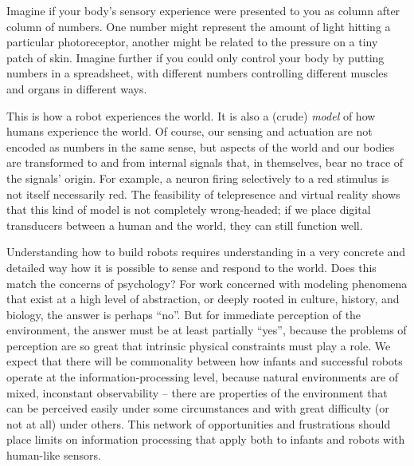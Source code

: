 


Imagine if your body's sensory experience were presented to you as
column after column of numbers.  One number might represent the amount
of light hitting a particular photoreceptor, another might be related
to the pressure on a tiny patch of skin.  Imagine further if you could
only control your body by putting numbers in a spreadsheet, with
different numbers controlling different muscles and organs in
different ways.

This is how a robot experiences the world.  It is also a (crude) {\em
model} of how humans experience the world.  Of course, our sensing and
actuation are not encoded as numbers in the same sense, but aspects of
the world and our bodies are transformed to and from internal signals that,
in themselves, bear no trace of the signals' origin.  For 
example, a neuron firing
selectively to a red stimulus is not itself necessarily red.  The
feasibility of telepresence and virtual reality shows that this kind of
model is not completely wrong-headed; if we place digital transducers
between a human and the world, they can still function well.

Understanding how to build robots requires understanding in a very
concrete and detailed way how it is possible to sense and respond to
the world.  Does this match the concerns of psychology?  For work
concerned with modeling phenomena that exist at a high level of
abstraction, or deeply rooted in culture, history, and biology, the
answer is perhaps ``no''.  But for immediate perception of the
environment, the answer must be at least partially ``yes'', because the
problems of perception are so great that intrinsic physical
%
%
constraints must play a
role.
%
%
%
%
%
%
%
%
%
%
%
We expect
that there will be commonality between how infants and successful
robots operate at the information-processing level, because natural
environments are of mixed, inconstant observability -- there are
properties of the environment that can be perceived easily under some
circumstances and with great difficulty (or not at all) under others.  
This network of opportunities and
frustrations should place limits on information processing that apply
both to infants and robots with human-like sensors.

